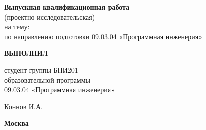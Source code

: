 \vfill

    \textbf{Выпускная квалификационная работа} \\
    (проектно-исследовательская) \\
    на тему: \textbf{\docTitle} \\
    по направлению подготовки 09.03.04 «Программная инженерия»

\vfill

    \makebox[0.45\textwidth]{}\hfil%
    \begin{minipage}[t]{0.45\textwidth}\centering
    	\textbf{ВЫПОЛНИЛ}
            
    	студент группы БПИ201 \\
    	образовательной программы \\
    	09.03.04 «Программная инженерия» \\
    \end{minipage}

\bigskip

    \makebox[0.45\textwidth]{}\hfil%
    \begin{minipage}[t]{0.45\textwidth}\centering
    	\placename Коннов И.А. \\
    	\placedate
    \end{minipage}

\vskip 1.5cm

    \textbf{Москва \YEAR}